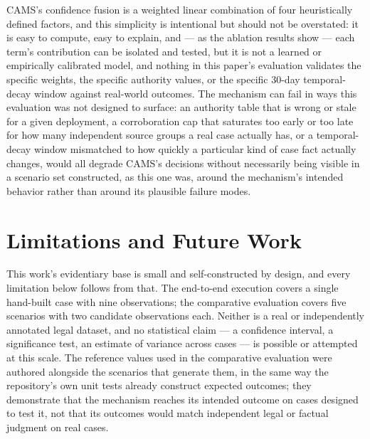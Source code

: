 \documentclass[conference]{IEEEtran}
\begin{document}
CAMS's confidence fusion is a weighted linear combination of four
heuristically defined factors, and this simplicity is intentional but
should not be overstated: it is easy to compute, easy to explain, and ---
as the ablation results show --- each term's contribution can be isolated
and tested, but it is not a learned or empirically calibrated model, and
nothing in this paper's evaluation validates the specific weights, the
specific authority values, or the specific 30-day temporal-decay window
against real-world outcomes. The mechanism can fail in ways this evaluation
was not designed to surface: an authority table that is wrong or stale for
a given deployment, a corroboration cap that saturates too early or too
late for how many independent source groups a real case actually has, or a
temporal-decay window mismatched to how quickly a particular kind of case
fact actually changes, would all degrade CAMS's decisions without
necessarily being visible in a scenario set constructed, as this one was,
around the mechanism's intended behavior rather than around its plausible
failure modes.

\section{Limitations and Future Work}

This work's evidentiary base is small and self-constructed by design, and
every limitation below follows from that. The end-to-end execution covers a
single hand-built case with nine observations; the comparative evaluation
covers five scenarios with two candidate observations each. Neither is a
real or independently annotated legal dataset, and no statistical claim ---
a confidence interval, a significance test, an estimate of variance across
cases --- is possible or attempted at this scale. The reference values used
in the comparative evaluation were authored alongside the scenarios that
generate them, in the same way the repository's own unit tests already
construct expected outcomes; they demonstrate that the mechanism reaches
its intended outcome on cases designed to test it, not that its outcomes
would match independent legal or factual judgment on real cases.
\end{document}
